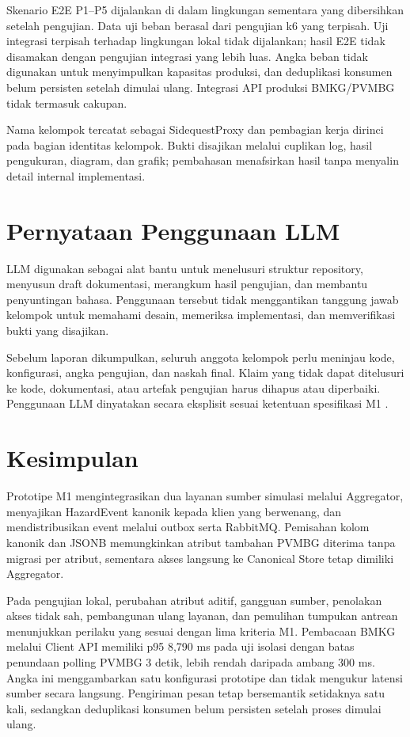 \documentclass{fairmeta}
\begin{document}
Skenario E2E P1--P5 dijalankan di dalam lingkungan sementara yang dibersihkan setelah pengujian. Data uji beban berasal dari pengujian k6 yang terpisah. Uji integrasi terpisah terhadap lingkungan lokal tidak dijalankan; hasil E2E tidak disamakan dengan pengujian integrasi yang lebih luas. Angka beban tidak digunakan untuk menyimpulkan kapasitas produksi, dan deduplikasi konsumen belum persisten setelah dimulai ulang. Integrasi API produksi BMKG/PVMBG tidak termasuk cakupan.

Nama kelompok tercatat sebagai SidequestProxy dan pembagian kerja dirinci pada bagian identitas kelompok. Bukti disajikan melalui cuplikan log, hasil pengukuran, diagram, dan grafik; pembahasan menafsirkan hasil tanpa menyalin detail internal implementasi.

\section{Pernyataan Penggunaan LLM}

LLM digunakan sebagai alat bantu untuk menelusuri struktur repository, menyusun draft dokumentasi, merangkum hasil pengujian, dan membantu penyuntingan bahasa. Penggunaan tersebut tidak menggantikan tanggung jawab kelompok untuk memahami desain, memeriksa implementasi, dan memverifikasi bukti yang disajikan.

Sebelum laporan dikumpulkan, seluruh anggota kelompok perlu meninjau kode, konfigurasi, angka pengujian, dan naskah final. Klaim yang tidak dapat ditelusuri ke kode, dokumentasi, atau artefak pengujian harus dihapus atau diperbaiki. Penggunaan LLM dinyatakan secara eksplisit sesuai ketentuan spesifikasi M1 \cite{spec-m1}.

\section{Kesimpulan}

Prototipe M1 mengintegrasikan dua layanan sumber simulasi melalui Aggregator, menyajikan HazardEvent kanonik kepada klien yang berwenang, dan mendistribusikan event melalui outbox serta RabbitMQ. Pemisahan kolom kanonik dan JSONB memungkinkan atribut tambahan PVMBG diterima tanpa migrasi per atribut, sementara akses langsung ke Canonical Store tetap dimiliki Aggregator.

Pada pengujian lokal, perubahan atribut aditif, gangguan sumber, penolakan akses tidak sah, pembangunan ulang layanan, dan pemulihan tumpukan antrean menunjukkan perilaku yang sesuai dengan lima kriteria M1. Pembacaan BMKG melalui Client API memiliki p95 8,790 ms pada uji isolasi dengan batas penundaan polling PVMBG 3 detik, lebih rendah daripada ambang 300 ms. Angka ini menggambarkan satu konfigurasi prototipe dan tidak mengukur latensi sumber secara langsung. Pengiriman pesan tetap bersemantik setidaknya satu kali, sedangkan deduplikasi konsumen belum persisten setelah proses dimulai ulang.
\end{document}
